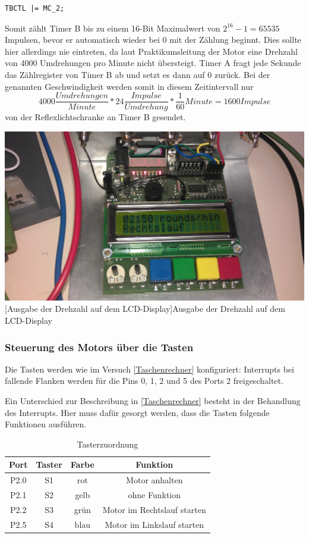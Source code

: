 \documentclass[12pt,a4paper,bibliography=totocnumbered,listof=totocnumbered]{scrartcl}
\begin{document}
\vspace{1em}
\begin{lstlisting}[caption=Starten von Timer B]
TBCTL |= MC_2;
\end{lstlisting}

Somit zählt Timer B bis zu einem 16-Bit Maximalwert von \(2^{16}-1=65535\) Impulsen, bevor er automatisch wieder bei 0 mit der Zählung beginnt. Dies sollte hier allerdings nie eintreten, da laut Praktikumsleitung der Motor eine Drehzahl von 4000 Umdrehungen pro Minute nicht übersteigt. Timer A fragt jede Sekunde das Zählregister von Timer B ab und setzt es dann auf 0 zurück. Bei der genannten Geschwindigkeit werden somit in diesem Zeitintervall nur
\[4000 \frac{Umdrehungen}{Minute} * 24 \frac{Impulse}{Umdrehung}*\frac{1}{60}Minute=1600Impulse\]
von der Reflexlichtschranke an Timer B gesendet.


\vspace{1em}
\begin{minipage}{\linewidth}
	\centering
	\includegraphics[width=0.7\linewidth]{img/MotorDrehzahl2.jpg}
	[Ausgabe der Drehzahl auf dem LCD-Display]{Ausgabe der Drehzahl auf dem LCD-Display}
	\label{fig:DrehzahlAusgabe}
\end{minipage}


\subsubsection{Steuerung des Motors über die Tasten}
Die Tasten werden wie im Versuch \ref{Taschenrechner} konfiguriert: Interrupts bei fallende Flanken werden für die Pins 0, 1, 2 und 5 des Ports 2 freigeschaltet.

Ein Unterschied zur Beschreibung in \ref{Taschenrechner} besteht in der Behandlung des Interrupts. Hier muss dafür gesorgt werden, dass die Tasten folgende Funktionen ausführen.

\begin{table}[h]
	\begin{centering}
		\begin{tabular}{|c|c|c|c|}
			\hline 
			\textbf{Port} & \textbf{Taster} & \textbf{Farbe} & \textbf{Funktion}\tabularnewline
			\hline 
			\hline 
			P2.0 & S1 & rot & Motor anhalten\tabularnewline
			\hline 
			P2.1 & S2 & gelb & ohne Funktion\tabularnewline
			\hline 
			P2.2 & S3 & grün & Motor im Rechtslauf starten\tabularnewline
			\hline 
			P2.5 & S4 & blau & Motor im Linkslauf starten\tabularnewline
			\hline 
		\end{tabular}
		\par\end{centering}
	\smallskip{}
	\protect\caption{Tasterzuordnung}
\end{table}
\end{document}
